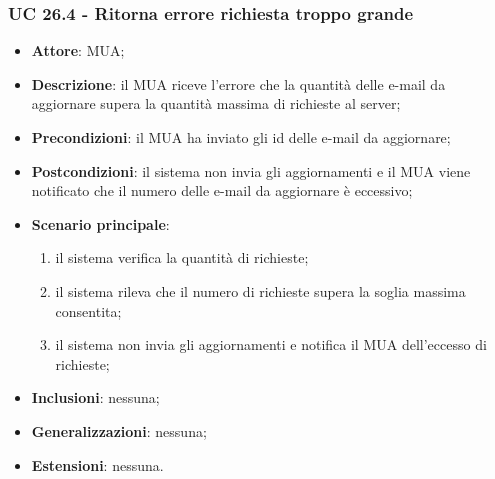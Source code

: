     \subsubsection{UC 26.4 - Ritorna errore richiesta troppo grande} \label{sec:UC26.4}
    \begin{itemize}
        \item \textbf{Attore}: MUA;
        \item \textbf{Descrizione}: il MUA riceve l'errore che la quantità delle e-mail da aggiornare supera la quantità massima di richieste al server;
        \item \textbf{Precondizioni}: il MUA ha inviato gli id delle e-mail da aggiornare;
        \item \textbf{Postcondizioni}: il sistema non invia gli aggiornamenti e il MUA viene notificato che il numero delle e-mail da aggiornare è eccessivo;
        \item \textbf{Scenario principale}:
            \begin{enumerate}
                \item il sistema verifica la quantità di richieste;
                \item il sistema rileva che il numero di richieste supera la soglia massima consentita;
                \item il sistema non invia gli aggiornamenti e notifica il MUA dell'eccesso di richieste;
            \end{enumerate}
        \item \textbf{Inclusioni}: nessuna;
        \item \textbf{Generalizzazioni}: nessuna;
        \item \textbf{Estensioni}: nessuna.
    \end{itemize}

